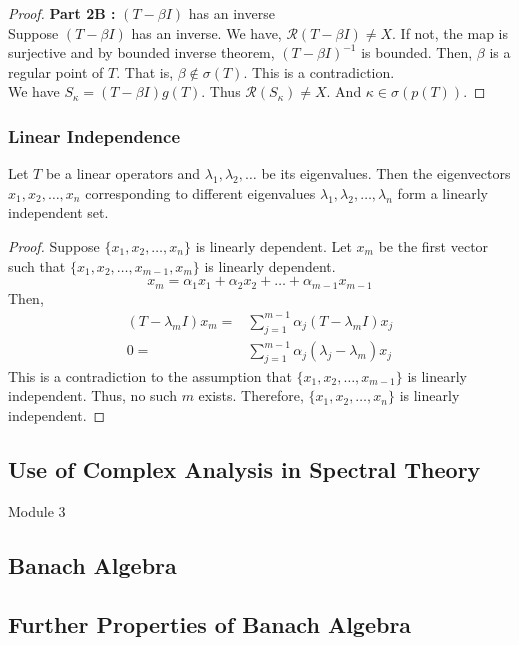 \begin{proof}
	\textbf{Part 2B :} $(T-\beta I)$ has an inverse\\
	Suppose $(T-\beta I)$ has an inverse.
	We have, $\mathscr{R}(T-\beta I) \ne X$.
	If not, the map is surjective and by bounded inverse theorem, $(T-\beta I)^{-1}$ is bounded.
	Then, $\beta$ is a regular point of $T$.
	That is, $\beta \notin \sigma(T)$.
	This is a contradiction.\\

	We have $S_\kappa = (T-\beta I)g(T)$.
	Thus $\mathscr{R}(S_\kappa) \ne X$.
	And $\kappa \in \sigma(p(T))$.
\end{proof}
\subsubsection{Linear Independence}
\begin{theorem}
	Let $T$ be a linear operators and $\lambda_1,\lambda_2,\dots$ be its eigenvalues.
	Then the eigenvectors $x_1,x_2,\dots,x_n$ corresponding to different eigenvalues $\lambda_1,\lambda_2,\dots,\lambda_n$ form a linearly independent set.
\end{theorem}
\begin{proof}
	Suppose $\{x_1,x_2,\dots,x_n\}$ is linearly dependent.
	Let $x_m$ be the first vector such that $\{ x_1,x_2,\dots,x_{m-1},x_m\}$ is linearly dependent.
	\[ x_m = \alpha_1 x_1 + \alpha_2 x_2 + \dots + \alpha_{m-1}x_{m-1} \]
	Then,
	\begin{align*}
		(T-\lambda_m I)x_m 
		= & \sum_{j=1}^{m-1} \alpha_j (T-\lambda_m I)x_j \\
		0 = & \sum_{j=1}^{m-1} \alpha_j (\lambda_j-\lambda_m)x_j
	\end{align*}
	This is a contradiction to the assumption that $\{ x_1,x_2,\dots,x_{m-1} \}$ is linearly independent.
	Thus, no such $m$ exists.
	Therefore, $\{x_1,x_2,\dots,x_n\}$ is linearly independent.
\end{proof}
\pagebreak

\subsection{Use of Complex Analysis in Spectral Theory}

{\Large Module 3}
\subsection{Banach Algebra}
\subsection{Further Properties of Banach Algebra}

